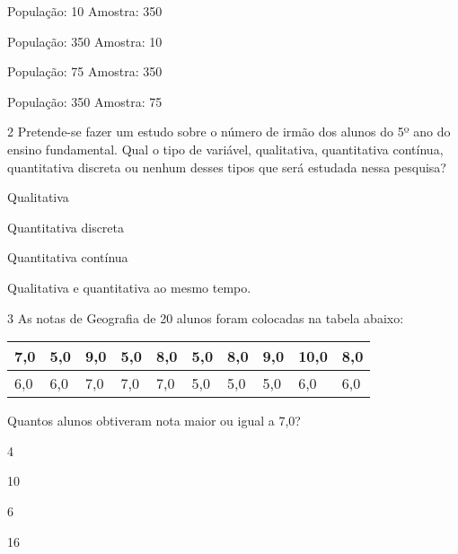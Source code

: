 {\begin{escolha}
\item
  População: 10 Amostra: 350
\item
  População: 350 Amostra: 10
\item
  População: 75 Amostra: 350
\item
  População: 350 Amostra: 75
\end{escolha}



\num{2} Pretende-se fazer um estudo sobre o número de irmão dos alunos do
5º ano do ensino fundamental. Qual o tipo de variável, qualitativa,
quantitativa contínua, quantitativa discreta ou nenhum desses tipos que
será estudada nessa pesquisa?

\begin{escolha}
\item
  Qualitativa
\item
  Quantitativa discreta
\item
  Quantitativa contínua
\item
  Qualitativa e quantitativa ao mesmo tempo.
\end{escolha}



\num{3} As notas de Geografia de 20 alunos foram colocadas na tabela
abaixo:

\begin{longtable}[]{@{}llllllllll@{}}
\toprule
7,0 & 5,0 & 9,0 & 5,0 & 8,0 & 5,0 & 8,0 & 9,0 & 10,0 &
8,0\tabularnewline
\midrule
\endhead
6,0 & 6,0 & 7,0 & 7,0 & 7,0 & 5,0 & 5,0 & 5,0 & 6,0 & 6,0\tabularnewline
\bottomrule
\end{longtable}

Quantos alunos obtiveram nota maior ou igual a 7,0?

\begin{escolha}
\item
  4
\item
  10
\item
  6
\item
  16
\end{escolha}

}
